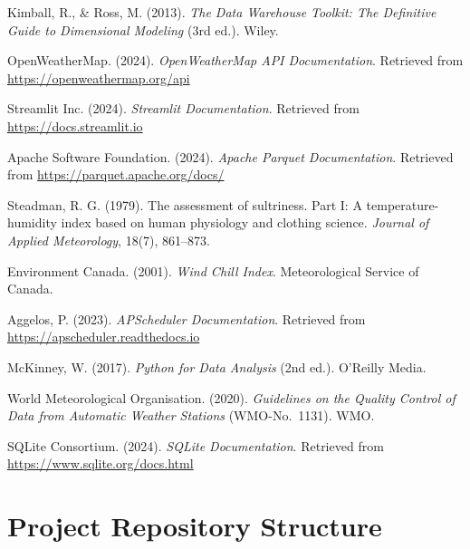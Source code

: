 \documentclass[12pt,a4paper]{report}
\begin{document}
\begin{enumerate}[leftmargin=*, label={[\arabic*]}]
  \item Kimball, R., \& Ross, M. (2013). \textit{The Data Warehouse Toolkit: The Definitive Guide to Dimensional Modeling} (3rd ed.). Wiley.
  \item OpenWeatherMap. (2024). \textit{OpenWeatherMap API Documentation}. Retrieved from \url{https://openweathermap.org/api}
  \item Streamlit Inc. (2024). \textit{Streamlit Documentation}. Retrieved from \url{https://docs.streamlit.io}
  \item Apache Software Foundation. (2024). \textit{Apache Parquet Documentation}. Retrieved from \url{https://parquet.apache.org/docs/}
  \item Steadman, R. G. (1979). The assessment of sultriness. Part I: A temperature-humidity index based on human physiology and clothing science. \textit{Journal of Applied Meteorology}, 18(7), 861--873.
  \item Environment Canada. (2001). \textit{Wind Chill Index}. Meteorological Service of Canada.
  \item Aggelos, P. (2023). \textit{APScheduler Documentation}. Retrieved from \url{https://apscheduler.readthedocs.io}
  \item McKinney, W. (2017). \textit{Python for Data Analysis} (2nd ed.). O'Reilly Media.
  \item World Meteorological Organisation. (2020). \textit{Guidelines on the Quality Control of Data from Automatic Weather Stations} (WMO-No.\ 1131). WMO.
  \item SQLite Consortium. (2024). \textit{SQLite Documentation}. Retrieved from \url{https://www.sqlite.org/docs.html}
\end{enumerate}

\appendix
\chapter{Project Repository Structure}
\end{document}
